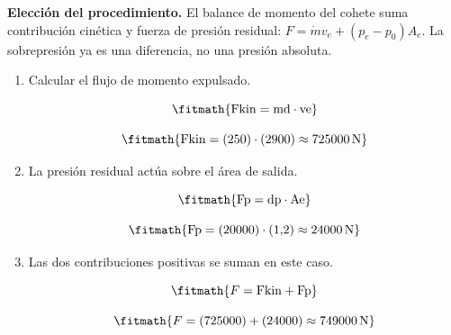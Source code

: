 \noindent\textbf{Elección del procedimiento.} El balance de momento del cohete suma contribución cinética y fuerza de presión residual: $F=\dot m v_e+(p_e-p_0)A_e$. La sobrepresión ya es una diferencia, no una presión absoluta.

\begin{enumerate}

\item Calcular el flujo de momento expulsado.

\[\fitmath{\mathrm{Fkin}=\mathrm{md}\cdot \mathrm{ve}}\]

\[\fitmath{\mathrm{Fkin}=(250)\cdot (2900)\approx 725000\,\mathrm{N}}\]

\item La presión residual actúa sobre el área de salida.

\[\fitmath{\mathrm{Fp}=\mathrm{dp}\cdot \mathrm{Ae}}\]

\[\fitmath{\mathrm{Fp}=(20000)\cdot (1{,}2)\approx 24000\,\mathrm{N}}\]

\item Las dos contribuciones positivas se suman en este caso.

\[\fitmath{F=\mathrm{Fkin}+\mathrm{Fp}}\]

\[\fitmath{F=(725000)+(24000)\approx 749000\,\mathrm{N}}\]

\end{enumerate}
